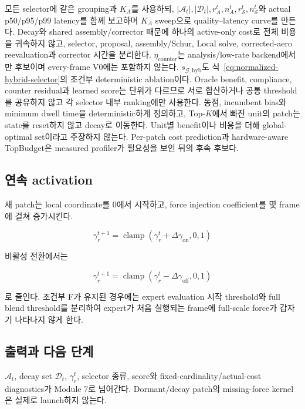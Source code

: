 \documentclass[11pt,a4paper]{article}
\newcommand{\clamp}{\operatorname{clamp}}
\begin{document}
모든 selector에 같은 grouping과 \(K_A\)를 사용하되,
\(|\mathcal A_t|,|\mathcal D_t|,r_A^t,n_A^t,r_{\mathcal S}^t,n_{\mathcal S}^t\)와
actual p50/p95/p99 latency를 함께 보고하며 \(K_A\) sweep으로 quality--latency curve를 만든다.
Decay와 shared assembly/corrector 때문에 하나의 active-only cost로 전체 비용을 귀속하지 않고,
selector, proposal, assembly/Schur, Local solve, corrected-aero reevaluation과 corrector 시간을 분리한다.
\(\eta_{\mathrm{counter}}\)는 analysis/low-rate backend에서만 후보이며 every-frame V0에는 포함하지 않는다.
\(s_{\mathcal G,\mathrm{hyb}}\)도 식~\eqref{eq:normalized-hybrid-selector}의 조건부 deterministic ablation이다.
Oracle benefit, compliance, counter residual과 learned score는 단위가 다르므로
서로 합산하거나 공통 threshold를 공유하지 않고 각 selector 내부 ranking에만 사용한다.
동점, incumbent bias와 minimum dwell time을 deterministic하게 정의하고,
Top-\(K\)에서 빠진 unit의 patch는 state를 reset하지 않고 decay로 이동한다.
Unit별 benefit이나 비용을 더해 global-optimal set이라고 주장하지 않는다.
Per-patch cost prediction과 hardware-aware TopBudget은 measured profiler가 필요성을 보인 뒤의 후속 후보다.

\subsection*{연속 activation}

새 patch는 local coordinate를 0에서 시작하고,
force injection coefficient를 몇 frame에 걸쳐 증가시킨다.

\begin{equation}
  \gamma_r^{t+1}
  =
  \clamp(\gamma_r^t+\Delta\gamma_{\mathrm{on}},0,1)
\end{equation}

비활성 전환에서는

\begin{equation}
  \gamma_r^{t+1}
  =
  \clamp(\gamma_r^t-\Delta\gamma_{\mathrm{off}},0,1)
\end{equation}

로 줄인다.
조건부 F가 유지된 경우에는 expert evaluation 시작 threshold와 full blend threshold를 분리하여
expert가 처음 실행되는 frame에 full-scale force가 갑자기 나타나지 않게 한다.

\subsection*{출력과 다음 단계}

\(\mathcal A_t\), decay set \(\mathcal D_t\), \(\gamma_r^t\),
selector 종류, score와 fixed-cardinality/actual-cost diagnostics가 Module 7로 넘어간다.
Dormant/decay patch의 missing-force kernel은 실제로 launch하지 않는다.
\end{document}
